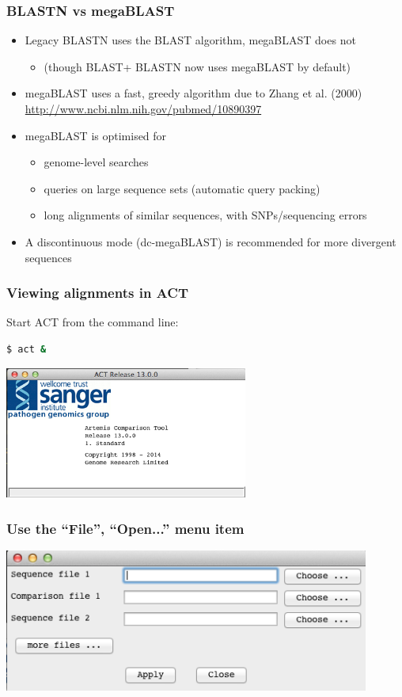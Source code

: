 \begin{frame}
  \frametitle{BLASTN vs megaBLAST}
  \begin{itemize}
    \item<1-> Legacy BLASTN uses the BLAST algorithm, megaBLAST does not
    \begin{itemize}
      \item (though BLAST+ BLASTN now uses megaBLAST by default)
    \end{itemize}      
    \item<1-> megaBLAST uses a fast, greedy algorithm due to Zhang et al. (2000) \url{http://www.ncbi.nlm.nih.gov/pubmed/10890397}
    \item<2-> megaBLAST is optimised for
    \begin{itemize}
      \item genome-level searches
      \item queries on large sequence sets (automatic query packing)
      \item long alignments of similar sequences, with SNPs/sequencing errors
    \end{itemize}
    \item<2-> A discontinuous mode (dc-megaBLAST) is recommended for more divergent sequences
  \end{itemize}
\end{frame}

\begin{frame}[fragile]
  \frametitle{Viewing alignments in ACT}
  Start ACT from the command line:
\begin{lstlisting}[language=bash]
$ act &
\end{lstlisting}
  \begin{center}
    \includegraphics[width=0.6\textwidth]{images/act_wgs1}
  \end{center}
\end{frame}

\begin{frame}
  \frametitle{Use the ``File'', ``Open...'' menu item}
  \begin{center}
    \includegraphics[width=0.9\textwidth]{images/act_wgs2}
  \end{center}
\end{frame}

